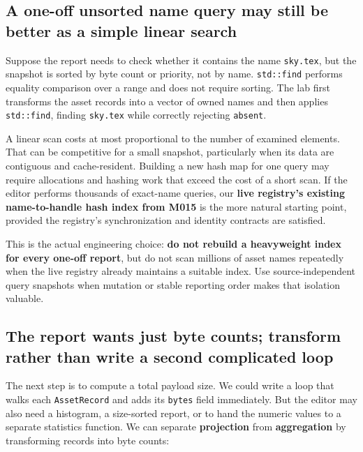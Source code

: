 \subsection{A one-off unsorted name query may still be better as a simple linear search}\label{05-engine-i-ch006-a-one-off-unsorted-name-query-may-still-be-better-as-a-simple-linear-search}

Suppose the report needs to check whether it contains the name \texttt{sky.tex}, but the snapshot is sorted by byte count or priority, not by name. \texttt{std::find} performs equality comparison over a range and does not require sorting. The lab first transforms the asset records into a vector of owned names and then applies \texttt{std::find}, finding \texttt{sky.tex} while correctly rejecting \texttt{absent}.

A linear scan costs at most proportional to the number of examined elements. That can be competitive for a small snapshot, particularly when its data are contiguous and cache-resident. Building a new hash map for one query may require allocations and hashing work that exceed the cost of a short scan. If the editor performs thousands of exact-name queries, our \textbf{live registry's existing name-to-handle hash index from M015} is the more natural starting point, provided the registry's synchronization and identity contracts are satisfied.

This is the actual engineering choice: \textbf{do not rebuild a heavyweight index for every one-off report}, but do not scan millions of asset names repeatedly when the live registry already maintains a suitable index. Use source-independent query snapshots when mutation or stable reporting order makes that isolation valuable.

\subsection{The report wants just byte counts; transform rather than write a second complicated loop}\label{05-engine-i-ch006-the-report-wants-just-byte-counts-transform-rather-than-write-a-second-complicated-loop}

The next step is to compute a total payload size. We could write a loop that walks each \texttt{AssetRecord} and adds its \texttt{bytes} field immediately. But the editor may also need a histogram, a size-sorted report, or to hand the numeric values to a separate statistics function. We can separate \textbf{projection} from \textbf{aggregation} by transforming records into byte counts:

